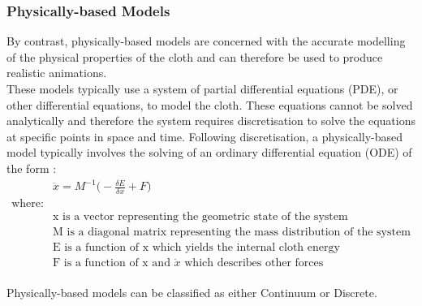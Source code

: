 \subsubsection{Physically-based Models}
By contrast, physically-based models are concerned with the accurate modelling of the physical properties of the cloth and can therefore be used to produce realistic animations.
\\These models typically use a system of partial differential equations (PDE), or other differential equations, to model the cloth. These equations cannot be solved analytically and therefore the system requires discretisation to solve the equations at specific points in space and time. Following discretisation, a physically-based model typically involves the solving of an ordinary differential equation (ODE) of the form \parencite[1]{Baraff1998}:
\begin{equation}
\begin{split}
\label{eq:general ODE}
  &\ddot{x} = M^{-1}\bigg(-\frac{\delta E}{\delta x} + F\bigg)
  \\\text{where:}
  \\&\text{x is a vector representing the geometric state of the system}
  \\&\text{M is a diagonal matrix representing the mass distribution of the system}
  \\&\text{E is a function of x which yields the internal cloth energy}
  \\&\text{F is a function of x and }\dot{x}\text{ which describes other forces}
  \end{split}
\end{equation}
\\Physically-based models can be classified as either Continuum or Discrete.

